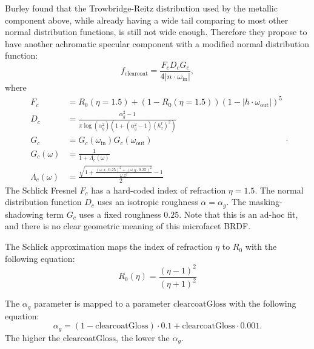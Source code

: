 Burley found that the Trowbridge-Reitz distribution used by the metallic component above, while already having a wide tail comparing to most other normal distribution functions, is still not wide enough. Therefore they propose to have another achromatic specular component with a modified normal distribution function:
\begin{equation}
f_{\text{clearcoat}} = \frac{F_c D_c G_c}{4 |n \cdot \omega_{\text{in}}|},
\label{eq:f_clearcoat}
\end{equation}
where
\begin{equation}
\begin{aligned}
F_c &= R_0(\eta = 1.5) + (1 - R_0(\eta = 1.5)) \left(1 - |h \cdot \omega_{\text{out}}|\right)^5 \\
D_c &= \frac{\alpha_g^2 - 1}{\pi \log(\alpha_g^2) \left( 1 + (\alpha_g^2 - 1) \left(h^l_z\right)^2 \right)} \\
G_c &= G_{c}(\omega_{\text{in}}) G_{c}(\omega_{\text{out}}) \\
G_{c}(\omega) &= \frac{1}{1 + \Lambda_c(\omega)} \\
\Lambda_c(\omega) &= \frac{\sqrt{1 + \frac{\left(\omega.x \cdot 0.25\right)^2 + \left(\omega.y \cdot 0.25\right)^2}{\omega.z^2}} - 1}{2}
\end{aligned}.
\end{equation}
The Schlick Fresnel $F_c$ has a hard-coded index of refraction $\eta = 1.5$. The normal distribution function $D_c$ uses an isotropic roughness $\alpha = \alpha_g$. The masking-shadowing term $G_c$ uses a fixed roughness $0.25$. Note that this is an ad-hoc fit, and there is no clear geometric meaning of this microfacet BRDF.

The Schlick approximation maps the index of refraction $\eta$ to $R_0$ with the following equation:
\begin{equation}
R_0(\eta) = \frac{\left(\eta - 1\right)^2}{\left(\eta + 1\right)^2}
\end{equation}

The $\alpha_g$ parameter is mapped to a parameter $\text{clearcoatGloss}$ with the following equation:
\begin{equation}
\alpha_g = (1 - \text{clearcoatGloss}) \cdot 0.1 + \text{clearcoatGloss} \cdot 0.001.
\end{equation}
The higher the $\text{clearcoatGloss}$, the lower the $\alpha_g$.

